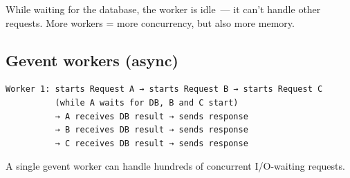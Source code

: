 \noindent{}While waiting for the database, the worker is idle~--- it can't handle other requests. More workers = more concurrency, but also more memory.

\subsection*{Gevent workers (async)}\label{36-scaling-load:gevent-workers-async}

\begin{outputbox}[short]
\begin{Verbatim}[fontsize=\codesize, breaklines, breakanywhere, breaksymbolleft={\tiny\textcolor{muted}{$\hookrightarrow$}}]
Worker 1: starts Request A → starts Request B → starts Request C
          (while A waits for DB, B and C start)
          → A receives DB result → sends response
          → B receives DB result → sends response
          → C receives DB result → sends response
\end{Verbatim}
\end{outputbox}

\noindent{}A single gevent worker can handle hundreds of concurrent I/O-waiting requests.

\begin{codebox}[short]

\begin{Shaded}
\begin{Highlighting}[]
\end{Highlighting}
\end{Shaded}

\end{codebox}

\begin{codebox}[short]

\begin{Shaded}
\begin{Highlighting}[]
\OperatorTok{=} 
\OperatorTok{=}           
\OperatorTok{=}    

\end{Highlighting}
\end{Shaded}

\end{codebox}

